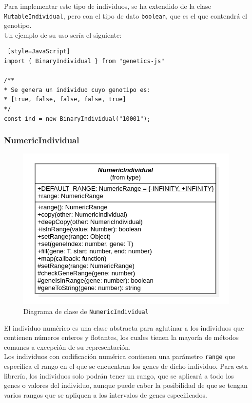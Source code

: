 Para implementar este tipo de individuos, se ha extendido de la clase \texttt{MutableIndividual}, pero con el tipo de dato \texttt{boolean}, que es el que contendrá el genotipo. \\

Un ejemplo de su uso sería el siguiente: \\

\begin{lstlisting} [style=JavaScript]
import { BinaryIndividual } from "genetics-js"

/**
* Se genera un individuo cuyo genotipo es:
* [true, false, false, false, true]
*/
const ind = new BinaryIndividual("10001");
\end{lstlisting}

\subsubsection{NumericIndividual}

\begin{figure}[H]
    \centering
    \includegraphics[scale=0.6]{mem/images/cap-4/4.2.2(Individuos)/NumericIndividual.png}
    \caption{Diagrama de clase de \texttt{NumericIndividual}}
    \label{fig:binaryindividual-uml}
\end{figure}

El individuo numérico es una clase abstracta para aglutinar a los individuos que contienen números enteros y flotantes, los cuales tienen la mayoría de métodos comunes a excepción de su representación. \\

Los individuos con codificación numérica contienen una parámetro \texttt{range} que especifica el rango en el que se encuentran los genes de dicho individuo. Para esta librería, los individuos solo podrán tener un rango, que se aplicará a todo los genes o valores del individuo, aunque puede caber la posibilidad de que se tengan varios rangos que se apliquen a los intervalos de genes especificados. \\

